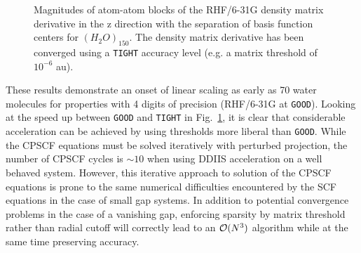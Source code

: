 \documentclass[prl,aps,twocolumn,showpacs,twocolumngrid,superbib]{revtex4}
\begin{document}
\begin{figure}
  \caption{\protect
    Magnitudes of atom-atom blocks of the RHF/6-31G density matrix derivative
    in the z direction with the separation of basis function centers for $(H_2O)_{150}$.
    The density matrix derivative has been converged using a {\tt TIGHT} accuracy level (e.g. 
    a matrix threshold of $10^{-6}$ au).
  }\label{fig:DPrimeZ_150_6-31G}
\end{figure}

These results demonstrate an onset of linear scaling as early as 70 water molecules
for properties with 4 digits of precision (RHF/6-31G at {\tt GOOD}). Looking at the
speed up between {\tt GOOD} and {\tt TIGHT} in Fig.~\ref{fig:DPrimeZ_150_6-31G}, it is clear
that considerable acceleration can be achieved by using thresholds more liberal than 
{\tt GOOD}.  While the CPSCF equations must be solved iteratively with perturbed projection,  
the number of CPSCF cycles is $\sim 10$ when using DDIIS acceleration on a well behaved system.
However, this iterative approach to solution of the CPSCF equations is prone to the same 
numerical difficulties encountered by the SCF equations in the case of small gap systems.  
In addition to potential convergence problems in the case of a vanishing gap, enforcing 
sparsity by matrix threshold rather than radial cutoff will correctly lead to an ${\cal O}(N^3)$ 
algorithm while at the same time preserving accuracy.
\end{document}
